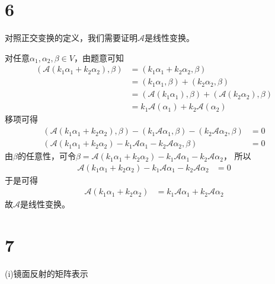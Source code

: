 \documentclass{article}
\begin{document}
\section*{6}

对照正交变换的定义，我们需要证明$\mathscr{A}$是线性变换。

对任意$\alpha_1, \alpha_2, \beta \in V$，由题意可知
\begin{align*}
  (\mathscr{A}(k_1 \alpha_1 + k_2 \alpha_2), \beta)
   & = (k_1 \alpha_1 + k_2 \alpha_2, \beta)                                    \\
   & = (k_1 \alpha_1, \beta) + (k_2 \alpha_2, \beta)                           \\
   & = (\mathscr{A}(k_1 \alpha_1), \beta) + (\mathscr{A}(k_2 \alpha_2), \beta) \\
   & = k_1 \mathscr{A}(\alpha_1) + k_2 \mathscr{A}(\alpha_2)
\end{align*}
移项可得
\begin{align*}
  (\mathscr{A}(k_1 \alpha_1 + k_2 \alpha_2), \beta) - (k_1 \mathscr{A}\alpha_1, \beta) - (k_2 \mathscr{A}\alpha_2, \beta) & = 0 \\
  (\mathscr{A}(k_1 \alpha_1 + k_2 \alpha_2) - k_1 \mathscr{A}\alpha_1 - k_2 \mathscr{A}\alpha_2, \beta)                   & = 0
\end{align*}
由$\beta$的任意性，可令$\beta = \mathscr{A}(k_1 \alpha_1 + k_2 \alpha_2) - k_1 \mathscr{A}\alpha_1 - k_2 \mathscr{A}\alpha_2$，
所以
\begin{align*}
  \mathscr{A}(k_1 \alpha_1 + k_2 \alpha_2) - k_1 \mathscr{A}\alpha_1 - k_2 \mathscr{A}\alpha_2 & = 0
\end{align*}
于是可得
\begin{align*}
  \mathscr{A}(k_1 \alpha_1 + k_2 \alpha_2) & = k_1 \mathscr{A}\alpha_1 + k_2 \mathscr{A}\alpha_2 
\end{align*}
故$\mathscr{A}$是线性变换。

\section*{7}

 (i)镜面反射的矩阵表示
\end{document}
